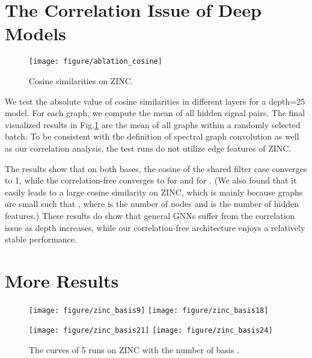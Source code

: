 \documentclass[nohyperref]{article}
\theoremstyle{plain}
\theoremstyle{definition}
\theoremstyle{remark}
\begin{document}
\section{The Correlation Issue of Deep Models}
\label{ablate_deep}

\begin{figure}[ht]
	\centering
	\texttt{[image: figure/ablation\_cosine]}
	\vspace{-10pt}
	\caption{Cosine similarities on ZINC.}
	\label{fig:zinc_cosine}
\end{figure}
We test the absolute value of cosine similarities in different layers for a depth=25 model. For each graph, we compute the mean of all hidden signal pairs. The final visualized results in Fig.\ref{fig:zinc_cosine} are the mean of all graphs within a randomly selected batch. To be consistent with the definition of spectral graph convolution as well as our correlation analysis, the test runs do not utilize edge features of ZINC.

The results show that on both bases, the cosine of the shared filter case converges to 1, while the correlation-free converges to  for  and  for .
(We also found that it easily leads to a large cosine similarity on ZINC, which is mainly because graphs are small such that , where  is the number of nodes and  is the number of hidden features.)
These results do show that general GNNs suffer from the correlation issue as depth increases, while our correlation-free architecture enjoys a relatively stable performance.

\FloatBarrier
\section{More Results}
\label{more_results}

\begin{figure}[h]
	\centering
	\texttt{[image: figure/zinc\_basis9]}
	\texttt{[image: figure/zinc\_basis18]}
\end{figure}
\begin{figure}[h]
	\texttt{[image: figure/zinc\_basis21]}
	\texttt{[image: figure/zinc\_basis24]}
	\caption{The curves of 5 runs on ZINC with the number of basis .}
	\label{fig:more_results1}
\end{figure}
\end{document}
